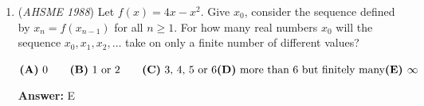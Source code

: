\begin{enumerate}
 -j314andrews

 



\textbf{Solution 2}

Apply one of the standard formulae for the gradient of the line of best fit, e.g. $\frac{\frac{\sum {x_i y_i}}{n} - \bar{x} \bar{y}}{\frac{\sum {x_{i}^2}}{n} - \bar{x}^2}$, and substitute in the given condition $x_3 - x_2 = x_2 - x_1$. The answer is $\boxed{\text{A}}$.

 



\textbf{Solution 3 (Linear Algebra)}

Let $A$ be a matrix and $x$ and $y$ be vectors. Recall that the least-squares error $||Ax - y||^2_2$ is minimized when $x = (A^T A)^{-1} A^T y$.

 In this case, $A = \begin{bmatrix}x_1 && 1 \\ x_2 && 1 \\x_3 && 1\end{bmatrix}$, $y = \begin{bmatrix}y_1\\y_2\\y_3\end{bmatrix}$, and $x = \begin{bmatrix}m \\ b\end{bmatrix}$, where $m$ and $b$ are the slope and $y$-intercept of the line of best fit, respectively.  Let $d = x_3 - x_2 = x_2 - x_1$, so $x_3 = x_2 + d$ and $x_1 = x_2 - d$.  Plugging these into $x = (A^T A)^{-1} A^T y$ yields $m = \frac{y_3 - y_1}{2d} = \boxed{(\textbf{A}) \frac{y_3 - y_1}{x_3 - x_1}}$.

 -j314andrews

 


	\item (\textit{AHSME 1988}) Let $f(x) = 4x - x^{2}$. Give $x_{0}$, consider the sequence defined by $x_{n} = f(x_{n-1})$ for all $n \ge 1$. 
For how many real numbers $x_{0}$ will the sequence $x_{0}, x_{1}, x_{2}, \ldots$ take on only a finite number of different values?


 $\textbf{(A)}\ \text{0}\qquad \textbf{(B)}\ \text{1 or 2}\qquad \textbf{(C)}\ \text{3, 4, 5 or 6}\qquad\\ \textbf{(D)}\ \text{more than 6 but finitely many}\qquad\\ \textbf{(E) }\infty$

 \textbf{Answer: }E




\end{enumerate}
